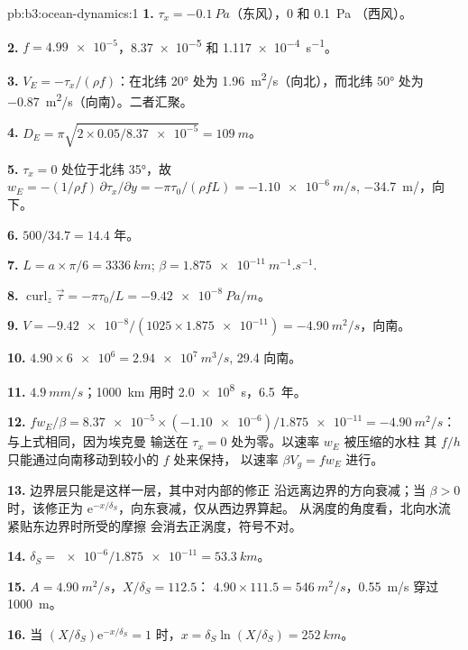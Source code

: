 \begin{solution}{pb:b3:ocean-dynamics:1}
\textbf{1.} $\tau_x = \qty{-0.1}{Pa}$（东风），0 和 \qty{+0.1}{Pa}
（西风）。

\textbf{2.} $f = \num{4.99e-5}$，\num{8.37e-5} 和
\qty{1.117e-4}{s^{-1}}。

\textbf{3.} $V_E = -\tau_x/(\rho f)$：在北纬
\ang{20} 处为 \qty{+1.96}{m^2/s}（向北），而北纬 \ang{50} 处为 \qty{-0.87}{m^2/s}（向南）。二者汇聚。

\textbf{4.} $D_E = \pi\sqrt{2\times0.05/\num{8.37e-5}} = \qty{109}{m}$。

\textbf{5.} $\tau_x = 0$ 处位于北纬 \ang{35}，故 $w_E = -(1/\rho f)\,
\partial\tau_x/\partial y = -\pi\tau_0/(\rho fL) = \qty{-1.10e-6}{m/s}$,
\qty{-34.7}{m/}，向下。

\textbf{6.} $500/34.7 = \num{14.4}\text{ 年}$。

\textbf{7.} $L = a\times\pi/6 = \qty{3336}{km}$; $\beta =
\qty{1.875e-11}{m^{-1}.s^{-1}}$.

\textbf{8.} $\operatorname{curl}_z\vec\tau = -\pi\tau_0/L =
\qty{-9.42e-8}{Pa/m}$。

\textbf{9.} $V = \num{-9.42e-8}/(1025\times\num{1.875e-11}) =
\qty{-4.90}{m^2/s}$，向南。

\textbf{10.} $4.90\times\num{6e6} = \qty{2.94e7}{m^3/s}$,
\qty{29.4}{\sverdrup} 向南。

\textbf{11.} $\qty{4.9}{mm/s}$；\qty{1000}{km} 用时
\qty{2.0e8}{s}，\num{6.5}~年。

\textbf{12.} $fw_E/\beta = \num{8.37e-5}\times(\num{-1.10e-6})/
\num{1.875e-11} = \qty{-4.90}{m^2/s}$：与上式相同，因为埃克曼
输送在 $\tau_x = 0$ 处为零。以速率 $w_E$ 被压缩的水柱
其 $f/h$ 只能通过向南移动到较小的 $f$ 处来保持，
以速率 $\beta V_g = fw_E$ 进行。

\textbf{13.} 边界层只能是这样一层，其中对内部的修正
沿远离边界的方向衰减；当 $\beta > 0$ 时，该修正为
$\mathrm e^{-x/\delta_S}$，向东衰减，仅从西边界算起。
从涡度的角度看，北向水流紧贴东边界时所受的摩擦
会消去正涡度，符号不对。

\textbf{14.} $\delta_S = \num{e-6}/\num{1.875e-11} = \qty{53.3}{km}$。

\textbf{15.} $A = \qty{4.90}{m^2/s}$，$X/\delta_S = 112.5$：
$4.90\times111.5 = \qty{546}{m^2/s}$，\qty{0.55}{m/s} 穿过
\qty{1000}{m}。

\textbf{16.} 当 $(X/\delta_S)\mathrm e^{-x/\delta_S} = 1$ 时，$x =
\delta_S\ln(X/\delta_S) = \qty{252}{km}$。


\end{solution}
